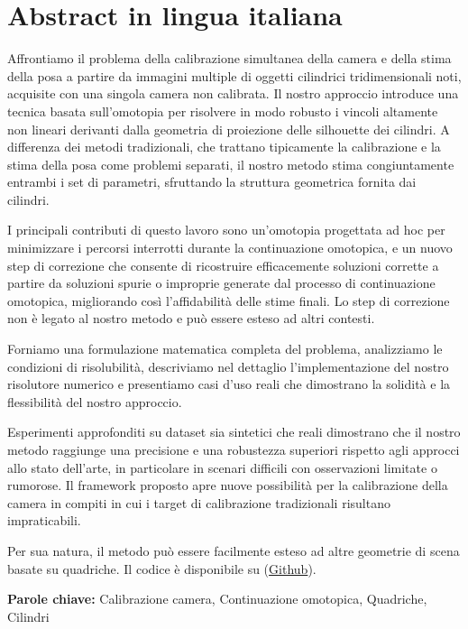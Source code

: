 \section*{Abstract in lingua italiana}
Affrontiamo il problema della calibrazione simultanea della camera e della stima della posa a partire da immagini multiple di oggetti cilindrici tridimensionali noti, acquisite con una singola camera non calibrata. Il nostro approccio introduce una tecnica basata sull'omotopia per risolvere in modo robusto i vincoli altamente non lineari derivanti dalla geometria di proiezione delle silhouette dei cilindri. A differenza dei metodi tradizionali, che trattano tipicamente la calibrazione e la stima della posa come problemi separati, il nostro metodo stima congiuntamente entrambi i set di parametri, sfruttando la struttura geometrica fornita dai cilindri.

I principali contributi di questo lavoro sono un'omotopia progettata ad hoc per minimizzare i percorsi interrotti durante la continuazione omotopica, e un nuovo step di correzione che consente di ricostruire efficacemente soluzioni corrette a partire da soluzioni spurie o improprie generate dal processo di continuazione omotopica, migliorando così l'affidabilità delle stime finali. Lo step di correzione non è legato al nostro metodo e può essere esteso ad altri contesti.

Forniamo una formulazione matematica completa del problema, analizziamo le condizioni di risolubilità, descriviamo nel dettaglio l’implementazione del nostro risolutore numerico e presentiamo casi d’uso reali che dimostrano la solidità e la flessibilità del nostro approccio.

Esperimenti approfonditi su dataset sia sintetici che reali dimostrano che il nostro metodo raggiunge una precisione e una robustezza superiori rispetto agli approcci allo stato dell’arte, in particolare in scenari difficili con osservazioni limitate o rumorose. Il framework proposto apre nuove possibilità per la calibrazione della camera in compiti in cui i target di calibrazione tradizionali risultano impraticabili.

Per sua natura, il metodo può essere facilmente esteso ad altre geometrie di scena basate su quadriche. Il codice è disponibile su (\href{https://github.com/EnricoBarbieri1997/cylinder-based-homotopy-camera-calibration}{Github}).

\vspace{15pt}
\begin{tcolorbox}[arc=0pt, boxrule=0pt, colback=bluePoli!60, width=\textwidth, colupper=white]
    \textbf{Parole chiave:} Calibrazione camera, Continuazione omotopica, Quadriche, Cilindri
\end{tcolorbox}